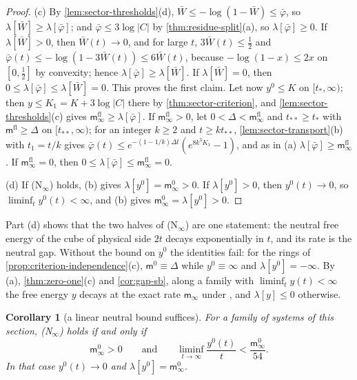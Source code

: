 \documentclass[11pt,a4paper]{amsart}
\newtheorem{corollary}[theorem]{Corollary}
\theoremstyle{definition}
\theoremstyle{remark}
\numberwithin{equation}{section}
\newcommand{\abs}[1]{\lvert #1\rvert}      %
\newcommand{\Mcirc}{\text{\upshape(M$^{\circ}$)}}   %
\begin{document}
\begin{proof}
(c) By \cref{lem:sector-thresholds}\textup{(d)}, $\bar W\le-\log(1-\bar W)\le\bar\varphi$, so $\lambda[\bar W]\ge\lambda[\bar\varphi]$; and $\bar\varphi\le3\log\abs{C}$ by \cref{thm:residue-split}\textup{(a)}, so $\lambda[\bar\varphi]\ge0$. If $\lambda[\bar W]>0$, then $\bar W(t)\to0$, and for large $t$, $3\bar W(t)\le\frac12$ and $\bar\varphi(t)\le-\log(1-3\bar W(t))\le6\bar W(t)$, because $-\log(1-x)\le2x$ on $[0,\frac12]$ by convexity; hence $\lambda[\bar\varphi]\ge\lambda[\bar W]$. If $\lambda[\bar W]=0$, then $0\le\lambda[\bar\varphi]\le\lambda[\bar W]=0$. This proves the first claim. Let now $y^0\le K$ on $[t_*,\infty)$; then $y\le K_1=K+3\log\abs{C}$ there by \cref{thm:sector-criterion}, and \cref{lem:sector-thresholds}\textup{(c)} gives $\mathsf m^{\mathrm{fl}}_\infty\ge\lambda[\bar\varphi]$. If $\mathsf m^{\mathrm{fl}}_\infty>0$, let $0<\Delta<\mathsf m^{\mathrm{fl}}_\infty$ and $t_{**}\ge t_*$ with $\mathsf m^{\mathrm{fl}}\ge\Delta$ on $[t_{**},\infty)$; for an integer $k\ge2$ and $t\ge kt_{**}$, \cref{lem:sector-transport}\textup{(b)} with $t_1=t/k$ gives $\bar\varphi(t)\le e^{-(1-1/k)\Delta t}(e^{8k^3K_1}-1)$, and as in (a) $\lambda[\bar\varphi]\ge\mathsf m^{\mathrm{fl}}_\infty$. If $\mathsf m^{\mathrm{fl}}_\infty=0$, then $0\le\lambda[\bar\varphi]\le\mathsf m^{\mathrm{fl}}_\infty=0$.

(d) If \textup{(N$_\infty$)} holds, (b) gives $\lambda[y^0]=\mathsf m^0_\infty>0$. If $\lambda[y^0]>0$, then $y^0(t)\to0$, so $\liminf_ty^0(t)<\infty$, and (b) gives $\mathsf m^0_\infty=\lambda[y^0]>0$.
\end{proof}

Part (d) shows that the two halves of \textup{(N$_\infty$)} are one statement: the neutral free energy of the cube of physical side $2t$ decays exponentially in $t$, and its rate is the neutral gap. Without the bound on $y^0$ the identities fail: for the rings of \cref{prop:criterion-independence}\textup{(c)}, $\mathsf m^0\equiv\Delta$ while $y^0\equiv\infty$ and $\lambda[y^0]=-\infty$. By (a), \cref{thm:zero-one}\textup{(c)} and \cref{cor:gap-sb}, along a family with $\liminf_ty(t)<\infty$ the free energy $y$ decays at the exact rate $\mathsf m_\infty$ under \Mcirc{}, and $\lambda[y]\le0$ otherwise.

\begin{corollary}[a linear neutral bound suffices]\label{cor:neutral-linear}
For a family of systems of this section, \textup{(N$_\infty$)} holds if and only if
\[
\mathsf m^0_\infty>0\qquad\text{and}\qquad\liminf_{t\to\infty}\frac{y^0(t)}t<\frac{\mathsf m^0_\infty}{54}.
\]
In that case $y^0(t)\to0$ and $\lambda[y^0]=\mathsf m^0_\infty$.
\end{corollary}
\end{document}
